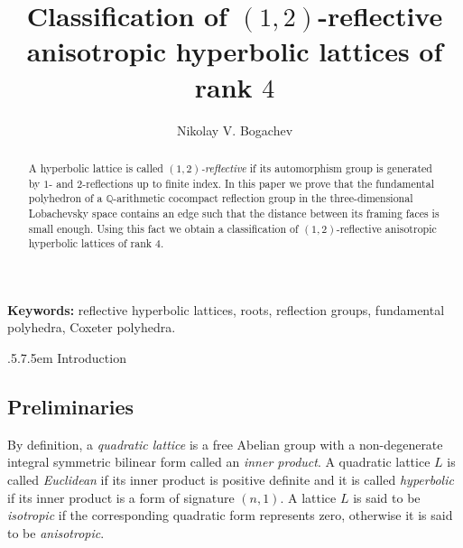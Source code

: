 \documentclass[reqno,12pt]{amsart}
\date{}
\makeatletter
\def\section{\@startsection{section}{2}%
    {\z@}{.5\linespacing\@plus.7\linespacing}{.5em}%
    {\normalfont\bfseries\centering}}
\newcounter{z}
\makeatother
\begin{document}
\title{Classification of $(1{,}2)$-reflective anisotropic hyperbolic lattices of rank $4$}

\author{Nikolay V. Bogachev}

\address{Moscow Institute of Physics and Technology;}

\address{Lomonosov Moscow State University;}

\address{Adyghe State University.}



\begin{abstract}
A hyperbolic lattice is called \textit{$(1{,}2)$-reflective} if its automorphism group
is generated by $1$- and $2$-reflections up to finite index.
In this paper we prove that the fundamental polyhedron of a $\mathbb{Q}$-arithmetic
cocompact reflection group in the three-dimensional Lobachevsky space contains an
edge such that the distance between its framing faces is small enough.
Using this fact we obtain a
classification of $(1{,}2)$-reflective anisotropic hyperbolic lattices of rank $4$.
\end{abstract}

\maketitle


\textbf{Keywords:}
reflective hyperbolic lattices, roots, reflection groups, fundamental polyhedra, Coxeter polyhedra.


\tableofcontents

\section{Introduction}
\label{s1}

\subsection{Preliminaries}
\label{ss1.1}

By definition, a \textit{quadratic lattice} is a free Abelian group with a non-degenerate integral
symmetric bilinear form
called an \textit{inner product}.
A quadratic lattice $L$ is
called \textit{Euclidean}
if its inner product is positive definite and it is called \textit{hyperbolic}
if its inner product is a form of signature $(n, 1)$.
A lattice $L$ is said to be \textit{isotropic} if the corresponding quadratic form represents zero,
otherwise it is said to be \textit{anisotropic}.
\end{document}
